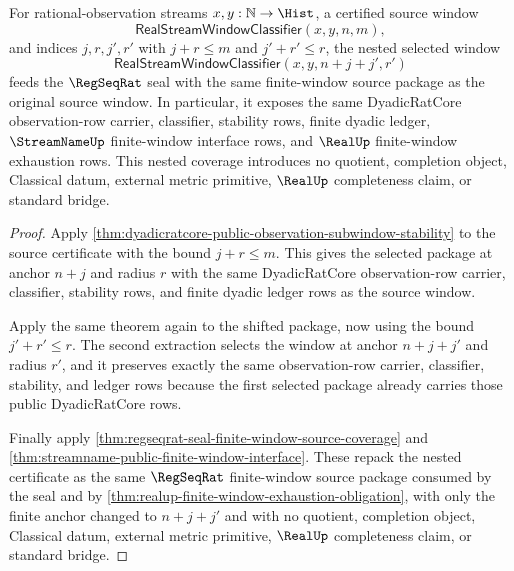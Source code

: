 \begin{theorem}
\label{thm:regseqrat-nested-subwindow-source-coverage}
For rational-observation streams $x,y:\mathbb{N}\to\Hist$, a certified source
window
$$
\mathsf{RealStreamWindowClassifier}(x,y,n,m),
$$
and indices $j,r,j',r'$ with $j+r\le m$ and $j'+r'\le r$, the nested selected
window
$$
\mathsf{RealStreamWindowClassifier}(x,y,n+j+j',r')
$$
feeds the $\RegSeqRat$ seal with the same finite-window source package as the
original source window. In particular, it exposes the same DyadicRatCore
observation-row carrier, classifier, stability rows, finite dyadic ledger,
$\StreamNameUp$ finite-window interface rows, and $\RealUp$ finite-window
exhaustion rows. This nested coverage introduces no quotient, completion
object, Classical datum, external metric primitive, $\RealUp$ completeness
claim, or standard bridge.
\end{theorem}
\begin{proof}
Apply \autoref{thm:dyadicratcore-public-observation-subwindow-stability} to the
source certificate with the bound $j+r\le m$. This gives the selected package at
anchor $n+j$ and radius $r$ with the same DyadicRatCore observation-row carrier,
classifier, stability rows, and finite dyadic ledger rows as the source window.

Apply the same theorem again to the shifted package, now using the bound
$j'+r'\le r$. The second extraction selects the window at anchor
$n+j+j'$ and radius $r'$, and it preserves exactly the same observation-row
carrier, classifier, stability, and ledger rows because the first selected
package already carries those public DyadicRatCore rows.

Finally apply \autoref{thm:regseqrat-seal-finite-window-source-coverage} and
\autoref{thm:streamname-public-finite-window-interface}. These repack the nested
certificate as the same $\RegSeqRat$ finite-window source package consumed by
the seal and by
\autoref{thm:realup-finite-window-exhaustion-obligation}, with only the finite
anchor changed to $n+j+j'$ and with no quotient, completion object, Classical
datum, external metric primitive, $\RealUp$ completeness claim, or standard
bridge.
\end{proof}

